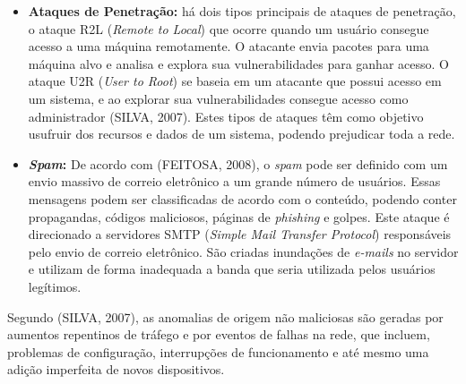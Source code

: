 \documentclass[12pt,openright,oneside,a4paper,english,spanish,brazil]{unifil}
\begin{document}
\begin{itemize}
  \item \textbf{Ataques de Penetração:} há dois tipos principais de ataques de penetração, o ataque R2L (\textit{Remote to Local}) que ocorre quando um usuário consegue acesso a uma máquina remotamente. O atacante envia pacotes para uma máquina alvo e analisa e explora sua vulnerabilidades para ganhar acesso. O ataque U2R (\textit{User to Root}) se baseia em um atacante que possui acesso em um sistema, e ao explorar sua vulnerabilidades consegue acesso como administrador (SILVA, 2007). Estes tipos de ataques têm como objetivo usufruir dos recursos e dados de um sistema, podendo prejudicar toda a rede.
  \item \textbf{\textit{Spam}:} De acordo com (FEITOSA, 2008), o \textit{spam} pode ser definido com um envio massivo de correio eletrônico a um grande número de usuários. Essas mensagens podem ser classificadas de acordo com o conteúdo, podendo conter propagandas, códigos maliciosos, páginas de \textit{phishing} e golpes. Este ataque é direcionado a servidores SMTP (\textit{Simple Mail Transfer Protocol}) responsáveis pelo envio de correio eletrônico. São criadas inundações de \textit{e-mails} no servidor e utilizam de forma inadequada a banda que seria utilizada pelos usuários legítimos.
  \end{itemize}  


\indent Segundo (SILVA, 2007), as anomalias de origem não maliciosas são geradas por  aumentos repentinos de tráfego e por eventos de falhas na rede, que incluem, problemas de configuração, interrupções de funcionamento e até mesmo uma adição imperfeita de novos dispositivos.
\end{document}

